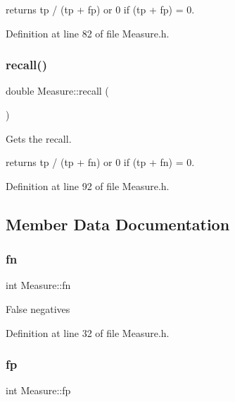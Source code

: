 returns tp / (tp + fp) or 0 if (tp + fp) = 0. 

Definition at line 82 of file Measure.\+h.

\mbox{\label{class_measure_afb7cbc9872452a8ce1f78e6f0661daa0}} 
\subsubsection{\texorpdfstring{recall()}{recall()}}
{\footnotesize\ttfamily double Measure\+::recall (\begin{DoxyParamCaption}{ }\end{DoxyParamCaption})\hspace{0.3cm}{\ttfamily [inline]}}

Gets the recall.

returns tp / (tp + fn) or 0 if (tp + fn) = 0. 

Definition at line 92 of file Measure.\+h.



\subsection{Member Data Documentation}
\mbox{\label{class_measure_ac0e820e813b633be8aa145f415aa81eb}} 
\subsubsection{\texorpdfstring{fn}{fn}}
{\footnotesize\ttfamily int Measure\+::fn\hspace{0.3cm}{\ttfamily [protected]}}

False negatives 

Definition at line 32 of file Measure.\+h.

\mbox{\label{class_measure_a2f4b9fd7379fc019a8dd276f316eddd7}} 
\subsubsection{\texorpdfstring{fp}{fp}}
{\footnotesize\ttfamily int Measure\+::fp\hspace{0.3cm}{\ttfamily [protected]}}

